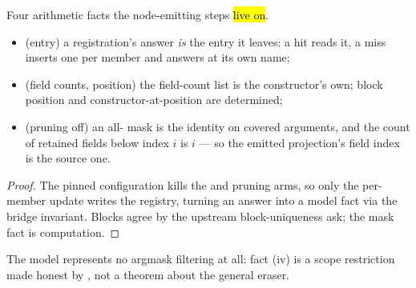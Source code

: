 \begin{lemma}
\label{lem:pass_register_inductive_entry}
\leanok
{}
 Four arithmetic facts the node-emitting steps \hl{live on}.
\begin{itemize}
\item (entry) a registration's answer \emph{is} the entry it leaves: a hit reads it, a miss inserts one
per member and answers at its own name;
\item (field counts, position) the field-count list is the constructor's own; block position and
constructor-at-position are determined;
\item (pruning off) an all- mask is the identity on covered arguments, and the count of
retained fields below index $i$ is $i$ --- so the emitted projection's field index is the source one.
\end{itemize}
\end{lemma}
\begin{proof}
\leanok
{}
 The pinned configuration kills the  and pruning arms, so only the per-member
update writes the registry, turning an answer into a model fact via the bridge invariant. Blocks agree by
the upstream block-uniqueness ask; the mask fact is computation.
\end{proof}

\begin{remark}
 The model represents no argmask filtering at all: fact (iv) is a scope restriction made
honest by , not a theorem about the general eraser.
\end{remark}

